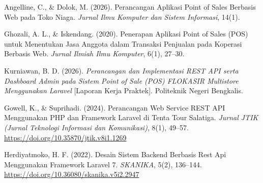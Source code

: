 

\noindent Angelline, C., \& Dolok, M. (2026). Perancangan Aplikasi Point of Sales Berbasis Web pada Toko Niaga. \textit{Jurnal Ilmu Komputer dan Sistem Informasi}, 14(1).

\vspace{0.2cm}
\noindent Ghozali, A. L., \& Iskendang. (2020). Penerapan Aplikasi Point of Sales (POS) untuk Menentukan Jasa Anggota dalam Transaksi Penjualan pada Koperasi Berbasis Web. \textit{Jurnal Ilmiah Ilmu Komputer}, 6(1), 27--30.

\vspace{0.2cm}
\noindent Kurniawan, B. D. (2026). \textit{Perancangan dan Implementasi REST API serta Dashboard Admin pada Sistem Point of Sale (POS) FLOKASIR Multistore Menggunakan Laravel} [Laporan Kerja Praktek]. Politeknik Negeri Bengkalis.

\vspace{0.4cm}

\noindent Gowell, K., \& Suprihadi. (2024). Perancangan Web Service REST API Menggunakan PHP dan Framework Laravel di Tenta Tour Salatiga. \textit{Jurnal JTIK (Jurnal Teknologi Informasi dan Komunikasi)}, 8(1), 49--57. \url{https://doi.org/10.35870/jtik.v8i1.1269}

\vspace{0.2cm}
\noindent Herdiyatmoko, H. F. (2022). Desain Sistem Backend Berbasis Rest Api Menggunakan Framework Laravel 7. \textit{SKANIKA}, 5(2), 136--144. \url{https://doi.org/10.36080/skanika.v5i2.2947}

